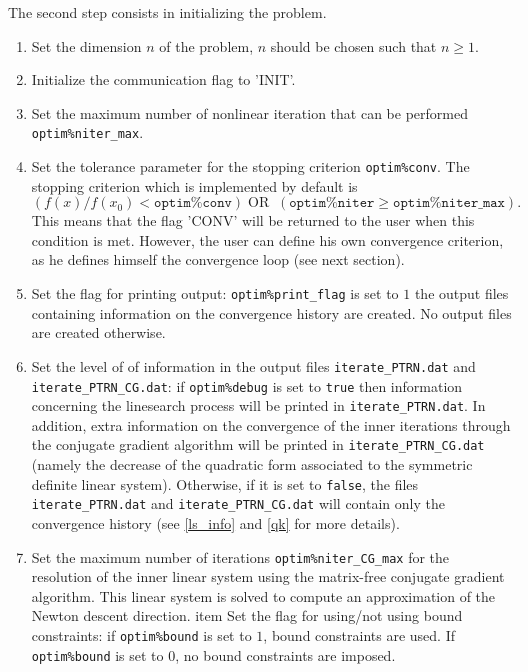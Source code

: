 \documentclass[a4paper,twoside,final,onecolumn,11pt,openright]{article}
\begin{document}
The second step consists in initializing the problem.
\begin{enumerate}
 \item Set the dimension $n$ of the problem, $n$ should be chosen such that $n\geq1$.
 \item Initialize the communication flag to 'INIT'.
 \item Set the maximum number of nonlinear iteration that can be performed \texttt{optim\%niter\_max}.
 \item Set the tolerance parameter for the stopping criterion \texttt{optim\%conv}. The stopping criterion which is implemented by default is 
\begin{equation}
 \left(f(x)/f(x_0)< \texttt{optim\%conv}\right) \; \textrm{OR} \;\;  \left(\texttt{optim\%niter}\geq\texttt{optim\%niter\_max}\right).
\end{equation}
This means that the flag 'CONV' will be returned to the user when this condition is met. However, the user can define his own convergence criterion, as he defines himself the convergence loop (see next section). 
\item Set the flag for printing output: \texttt{optim\%print\_flag} is set to $1$ the output files containing information on the convergence history are created. No output files are created otherwise.
 \item Set the level of of information in the output files \texttt{iterate\_PTRN.dat} and \texttt{iterate\_PTRN\_CG.dat}: if \texttt{optim\%debug} is set to \texttt{true} then information concerning the linesearch process will be printed in \texttt{iterate\_PTRN.dat}. In addition, extra information on the convergence of the inner iterations through the conjugate gradient algorithm will be printed in \texttt{iterate\_PTRN\_CG.dat} (namely the decrease of the quadratic form associated to the symmetric definite linear system). Otherwise, if it is set to \texttt{false}, the files \texttt{iterate\_PTRN.dat} and \texttt{iterate\_PTRN\_CG.dat} will contain only the convergence history (see \ref{ls_info} and \ref{qk} for more details).
\item Set the maximum number of iterations \texttt{optim\%niter\_CG\_max} for the resolution of the inner linear system using the matrix-free conjugate gradient algorithm. This linear system is solved to compute an approximation of the Newton descent direction. 
item Set the flag for using/not using bound constraints: if \texttt{optim\%bound} is set to $1$, bound constraints are used. If  \texttt{optim\%bound} is set to $0$, no bound constraints are imposed.

\end{enumerate}
\end{document}
